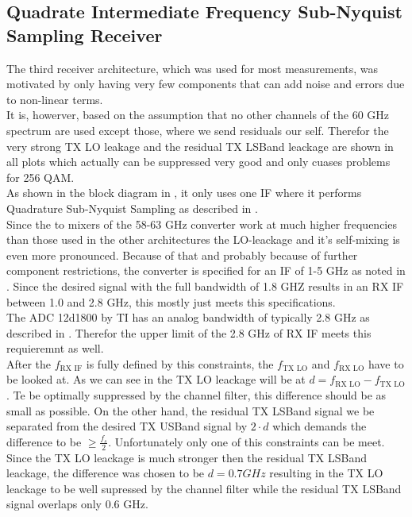 \subsection{Quadrate Intermediate Frequency Sub-Nyquist Sampling Receiver}
\label{sec:rx_2}
The third receiver architecture, which was used for most measurements,
was motivated by only having very few components that can add noise
and errors due to non-linear terms. \\

It is, howerver, based on the assumption that no other channels of the
60 GHz spectrum are used except those, where we send residuals our self.
Therefor the very strong \gls{TX} \gls{LO} leakage and
the residual \gls{TX} \gls{LSBand} leackage are shown in all plots
which actually can be suppressed very good and only cuases problems
for 256 \gls{QAM}.  \\

As shown in the block diagram in , it only uses one
\gls{IF} where it performs Quadrature Sub-Nyquist Sampling as described
in . \\

Since the to mixers of the 58-63 GHz converter work at much
higher frequencies than those used in the other architectures the
\gls{LO}-leackage and it's self-mixing is even more pronounced.
Because of that and probably because of further component restrictions,
the converter is specified for an \gls{IF} of 1-5 GHz as noted in
.
Since the desired signal with the full bandwidth of 1.8 GHZ results
in an \gls{RX} \gls{IF} between 1.0 and 2.8 GHz, this mostly just meets
this specifications. \\

The \gls{ADC} 12d1800 by TI has an analog bandwidth of typically 2.8 GHz
as described in .
Therefor the upper limit of the 2.8 GHz of \gls{RX} \gls{IF} meets this
requieremnt as well. \\

After the $f_{\text{RX IF}}$ is fully defined by this constraints, the
$f_{\text{TX LO}}$ and $f_{\text{RX LO}}$ have to be looked at.
As we can see in  the \gls{TX} \gls{LO}
leackage will be at $d = f_{\text{RX LO}} - f_{\text{TX LO}}$. Te be optimally
suppressed by the channel filter, this difference should be as small
as possible. On the other hand, the residual \gls{TX} \gls{LSBand} signal
we be separated from the desired \gls{TX} \gls{USBand} signal by $2 \cdot d$
which demands the difference to be $\geq \frac{f_s}{2}$.
Unfortunately only one of this constraints can be meet. Since the \gls{TX}
\gls{LO} leackage is much stronger then the residual \gls{TX} \gls{LSBand}
leackage, the difference was chosen to be $d = 0.7 GHz$ resulting in the
\gls{TX} \gls{LO} leackage to be well supressed by the channel filter while
the residual \gls{TX} \gls{LSBand} signal overlaps only 0.6 GHz. \\


